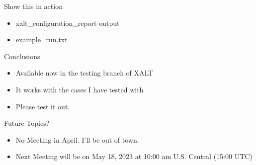 \documentclass{beamer}
\begin{document}
\begin{frame}{Show this in action}
  \begin{itemize}
    \item xalt\_configuration\_report output
    \item example\_run.txt
  \end{itemize}
\end{frame}

\begin{frame}{Conclusions}
  \begin{itemize}
    \item Available now in the testing branch of XALT
    \item It works with the cases I have tested with
    \item Please test it out.
  \end{itemize}
\end{frame}

\begin{frame}{Future Topics?}
  \begin{itemize}
    \item No Meeting in April.  I'll be out of town.
    \item Next Meeting will be on May 18, 2023 at 10:00 am
      U.S. Central (15:00 UTC)
  \end{itemize}
\end{frame}

%
\end{document}

